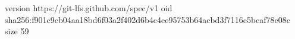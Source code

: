 version https://git-lfs.github.com/spec/v1
oid sha256:f901c9cb04aa18bd6f03a2f402d6b4c4ee95753b64acbd3f7116c5bcaf78e08c
size 59
